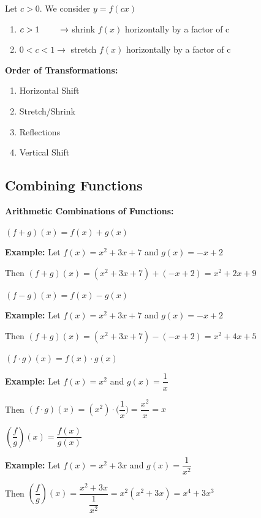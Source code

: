 \documentclass[12pt]{article}
\newenvironment{myindentpar}[1]%
     {\begin{list}{}%
             {\setlength{\leftmargin}{#1}}%
             \item[]%
     }
     {\end{list}}
\begin{document}
\centerline{Let $c>0$. We consider $y=f(cx)$}

\begin{enumerate}
\item $c>1 \hspace{.75cm} \to$ shrink $f(x)$ horizontally by a factor of c
\item $0<c<1 \to$ stretch $f(x)$ horizontally by a factor of c
\end{enumerate}

\textbf{Order of Transformations:}

\begin{enumerate}

\item Horizontal Shift 
\item Stretch/Shrink 
\item Reflections
\item Vertical Shift

\end{enumerate}

\subsection{Combining Functions}

\textbf{Arithmetic Combinations of Functions:}

\begin{enumerate}
\item $(f+g)(x) = f(x) + g(x)$
\begin{myindentpar}{1cm}
\textbf{Example:} Let $f(x) = x^2+3x+7$ and $g(x) = -x+2$

Then $(f+g)(x) =  (x^2+3x+7) + (-x+2) = x^2+2x+9$

\end{myindentpar}
\item $(f-g)(x) = f(x) - g(x)$

\begin{myindentpar}{1cm}
\textbf{Example:} Let $f(x) = x^2+3x+7$ and $g(x) = -x+2$

Then $(f+g)(x) =  (x^2+3x+7) - (-x+2) = x^2+4x+5$

\end{myindentpar}

\item $(f \cdot g)(x) = f(x) \cdot g(x)$
\begin{myindentpar}{1cm}
\textbf{Example:} Let $f(x) = x^2$ and $g(x) = \dfrac{1}{x}$

Then $(f \cdot g)(x) =  (x^2) \cdot \Big(\dfrac{1}{x}\Big) = \dfrac{x^2}{x} = x$

\end{myindentpar}


\item $(\dfrac{f}{g})(x) = \dfrac{f(x)}{g(x)}$

\begin{myindentpar}{1cm}
\textbf{Example:} Let $f(x) = x^2+3x$ and $g(x) = \dfrac{1}{x^2}$

Then $(\dfrac{f}{g})(x) =  \dfrac{x^2+3x}{\dfrac{1}{x^2}} = x^2(x^2+3x) = x^4+3x^3$

\end{myindentpar}
\end{enumerate}
\end{document}
